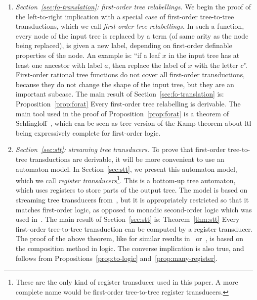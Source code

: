\begin{enumerate}
    \item \emph{Section~\ref{sec:fo-translation}: first-order tree relabellings.} We begin the proof of the left-to-right  implication  with a special case of first-order tree-to-tree transductions, which we call \emph{first-order  tree relabellings.} In such a  function, every node of the input tree is replaced by a term (of same arity as the node being replaced),  is given a new label, depending on first-order definable properties of the node. An example is:  ``if a leaf $x$ in the input tree has at least one ancestor with label $a$, then replace the label of $x$ with the letter $c$''. First-order rational tree functions do not cover all first-order transductions, because they do not change the shape of the input tree, but they are an important subcase.
    The main result of Section~\ref{sec:fo-translation} is:
    \announce
    {Proposition~\ref{prop:forat}}
    {Every first-order tree relabelling is derivable.}
    The main tool used in the proof of Proposition~\ref{prop:forat} is a theorem of Schlingloff~\cite[Theorem 2.6]{schlingloff1992expressive}, which can be seen as tree version of the Kamp theorem about {\sc ltl} being  expressively complete for first-order logic.  
    \item \emph{Section~\ref{sec:stt}: streaming tree transducers. }To prove that  first-order tree-to-tree transductions are derivable, it will be more convenient to use an automaton model. In Section~\ref{sec:stt}, we present  this  automaton model, which we call \emph{register transducers}\footnote{These are the only kind of register transducer used in this paper. A more complete name would be first-order tree-to-tree register transducers.}. This  is a bottom-up tree automaton, which uses registers to store parts of the output tree. The model is based on streaming tree transducers from~\cite{alur2017streaming}, but it is  appropriately restricted so that it matches first-order logic, as opposed to monadic second-order logic which was used in~\cite{alur2017streaming}. The main result of Section~\ref{sec:stt} is:
    \announce
    {Theorem~\ref{thm:stt}}
    {Every first-order  tree-to-tree transduction can be computed by a  register transducer.}
    The proof of the above theorem, like for similar results in~\cite{alur2017streaming} or~\cite[Theorem 23]{engelfrietMSODefinableString2001}, is based on the composition method in logic. 
    The converse implication is also true, and follows from Propositions~\ref{prop:to-logic} and~\ref{prop:many-register}.
    

\end{enumerate}
